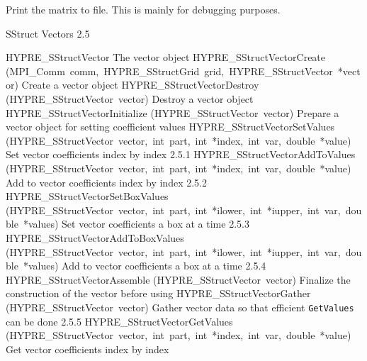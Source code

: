 \documentclass{article}
\begin{document}
\begin{cxxentry}
\begin{cxxentry}
\begin{cxxfunction}
\begin{cxxdoc}
Print the matrix to file.  This is mainly for debugging purposes.
\end{cxxdoc}
\end{cxxfunction}
\end{cxxentry}
\begin{cxxentry}
{}
        {SStruct Vectors}
        {}
        {
}
        {2.5}
\begin{cxxnames}
        {HYPRE\_SStructVector}
        {}
        {
The vector object}
        {}
\label{cxx.2.5.11}
        {HYPRE\_SStructVectorCreate}
        {(MPI\_Comm\ comm,\ HYPRE\_SStructGrid\ grid,\ HYPRE\_SStructVector\ *vector)}
        {
Create a vector object}
        {}
\label{cxx.2.5.12}
        {HYPRE\_SStructVectorDestroy}
        {(HYPRE\_SStructVector\ vector)}
        {
Destroy a vector object}
        {}
\label{cxx.2.5.13}
        {HYPRE\_SStructVectorInitialize}
        {(HYPRE\_SStructVector\ vector)}
        {
Prepare a vector object for setting coefficient values}
        {}
\label{cxx.2.5.14}
        {HYPRE\_SStructVectorSetValues}
        {(HYPRE\_SStructVector\ vector,\ int\ part,\ int\ *index,\ int\ var,\ double\ *value)}
        {
Set vector coefficients index by index}
        {2.5.1}
        {HYPRE\_SStructVectorAddToValues}
        {(HYPRE\_SStructVector\ vector,\ int\ part,\ int\ *index,\ int\ var,\ double\ *value)}
        {
Add to vector coefficients index by index}
        {2.5.2}
        {HYPRE\_SStructVectorSetBoxValues}
        {(HYPRE\_SStructVector\ vector,\ int\ part,\ int\ *ilower,\ int\ *iupper,\ int\ var,\ double\ *values)}
        {
Set vector coefficients a box at a time}
        {2.5.3}
        {HYPRE\_SStructVectorAddToBoxValues}
        {(HYPRE\_SStructVector\ vector,\ int\ part,\ int\ *ilower,\ int\ *iupper,\ int\ var,\ double\ *values)}
        {
Add to vector coefficients a box at a time}
        {2.5.4}
        {HYPRE\_SStructVectorAssemble}
        {(HYPRE\_SStructVector\ vector)}
        {
Finalize the construction of the vector before using}
        {}
\label{cxx.2.5.15}
        {HYPRE\_SStructVectorGather}
        {(HYPRE\_SStructVector\ vector)}
        {
Gather vector data so that efficient {\tt GetValues} can be done}
        {2.5.5}
        {HYPRE\_SStructVectorGetValues}
        {(HYPRE\_SStructVector\ vector,\ int\ part,\ int\ *index,\ int\ var,\ double\ *value)}
        {
Get vector coefficients index by index}

\end{cxxnames}
\end{cxxentry}
\end{cxxentry}
\end{document}
